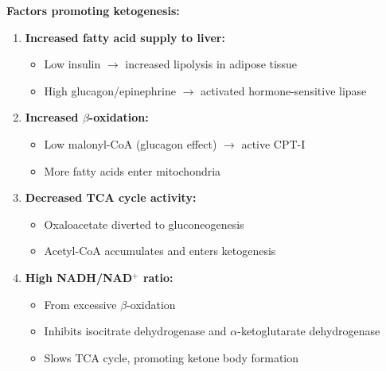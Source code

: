 \textbf{Factors promoting ketogenesis:}

\begin{enumerate}
    \item \textbf{Increased fatty acid supply to liver:}
    \begin{itemize}
        \item Low insulin $\rightarrow$ increased lipolysis in adipose tissue
        \item High glucagon/epinephrine $\rightarrow$ activated hormone-sensitive lipase
    \end{itemize}
    
    \item \textbf{Increased $\beta$-oxidation:}
    \begin{itemize}
        \item Low malonyl-CoA (glucagon effect) $\rightarrow$ active CPT-I
        \item More fatty acids enter mitochondria
    \end{itemize}
    
    \item \textbf{Decreased TCA cycle activity:}
    \begin{itemize}
        \item Oxaloacetate diverted to gluconeogenesis
        \item Acetyl-CoA accumulates and enters ketogenesis
    \end{itemize}
    
    \item \textbf{High NADH/NAD$^+$ ratio:}
    \begin{itemize}
        \item From excessive $\beta$-oxidation
        \item Inhibits isocitrate dehydrogenase and $\alpha$-ketoglutarate dehydrogenase
        \item Slows TCA cycle, promoting ketone body formation
    \end{itemize}
\end{enumerate}

